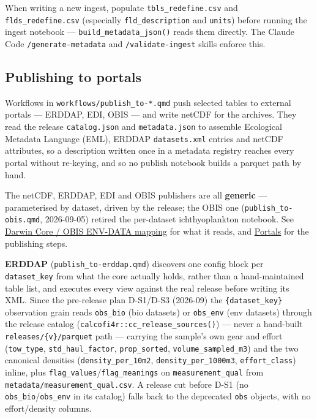 \documentclass[
  letterpaper,
  DIV=11,
  numbers=noendperiod]{scrreprt}
\begin{document}
When writing a new ingest, populate \texttt{tbls\_redefine.csv} and
\texttt{flds\_redefine.csv} (especially \texttt{fld\_description} and
\texttt{units}) before running the ingest notebook ---
\texttt{build\_metadata\_json()} reads them directly. The Claude Code
\texttt{/generate-metadata} and \texttt{/validate-ingest} skills enforce
this.

\subsection{Publishing to portals}\label{publishing-to-portals}

Workflows in \texttt{workflows/publish\_to-*.qmd} push selected tables
to external portals --- ERDDAP, EDI, OBIS --- and write netCDF for the
archives. They read the release \texttt{catalog.json} and
\texttt{metadata.json} to assemble Ecological Metadata Language (EML),
ERDDAP \texttt{datasets.xml} entries and netCDF attributes, so a
description written once in a metadata registry reaches every portal
without re-keying, and so no publish notebook builds a parquet path by
hand.

The netCDF, ERDDAP, EDI and OBIS publishers are all \textbf{generic} ---
parameterised by dataset, driven by the release; the OBIS one
(\texttt{publish\_to-obis.qmd}, 2026-09-05) retired the per-dataset
ichthyoplankton notebook. See
\hyperref[darwin-core-obis-env-data-mapping]{Darwin Core / OBIS ENV-DATA
mapping} for what it reads, and \hyperref[obis]{Portals} for the
publishing steps.

\textbf{ERDDAP} (\texttt{publish\_to-erddap.qmd}) discovers one config
block per \texttt{dataset\_key} from what the core actually holds,
rather than a hand-maintained table list, and executes every view
against the real release before writing its XML. Since the pre-release
plan D-S1/D-S3 (2026-09) the \texttt{\{dataset\_key\}} observation grain
reads \texttt{obs\_bio} (bio datasets) or \texttt{obs\_env} (env
datasets) through the release catalog
(\texttt{calcofi4r::cc\_release\_sources()}) --- never a hand-built
\texttt{releases/\{v\}/parquet} path --- carrying the sample's own gear
and effort (\texttt{tow\_type}, \texttt{std\_haul\_factor},
\texttt{prop\_sorted}, \texttt{volume\_sampled\_m3}) and the two
canonical densities (\texttt{density\_per\_10m2},
\texttt{density\_per\_1000m3}, \texttt{effort\_class}) inline, plus
\texttt{flag\_values}/\texttt{flag\_meanings} on
\texttt{measurement\_qual} from \texttt{metadata/measurement\_qual.csv}.
A release cut before D-S1 (no \texttt{obs\_bio}/\texttt{obs\_env} in its
catalog) falls back to the deprecated \texttt{obs} objects, with no
effort/density columns.
\end{document}

